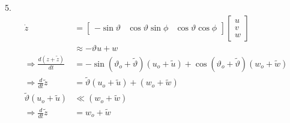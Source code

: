 5.
\begin{align*}
\dot{z}&=\begin{bmatrix}-\sin\vartheta&\cos\vartheta\sin\phi&\cos\vartheta\cos\phi\end{bmatrix}
\begin{bmatrix}u\\v\\w\end{bmatrix}\\
&\approx -\vartheta u + w\\
\Rightarrow\frac{d(z + \tilde{z})}{dt} &=-\sin(\vartheta_o+\tilde\vartheta)(u_o+\tilde{u})+\cos(\vartheta_o+\tilde\vartheta)(w_o+\tilde{w})\\
\Rightarrow\frac{d}{dt}\tilde{z}&=\tilde\vartheta(u_o+\tilde{u})+(w_o+\tilde{w})\\
\tilde\vartheta(u_o+\tilde{u})&\ll (w_o+\tilde{w})\\
\Rightarrow\frac{d}{dt}\tilde{z}&=w_o+\tilde{w}
\end{align*}
